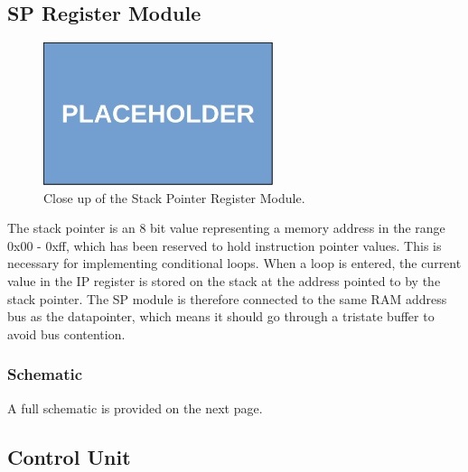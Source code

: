 \subsection{SP Register Module}
\begin{figure}[H]
  \centering
  \includegraphics[width=0.6\textwidth]{img/placeholder}
  \caption{Close up of the Stack Pointer Register Module.}
  \label{fig:spregcloseup}
\end{figure}

The stack pointer is an 8 bit value representing a memory address in the range 0x00 - 0xff, which has been reserved to hold instruction pointer values. This is necessary for implementing conditional loops. When a loop is entered, the current value in the IP register is stored on the stack at the address pointed to by the stack pointer. The SP module is therefore connected to the same RAM address bus as the datapointer, which means it should go through a tristate buffer to avoid bus contention.


\subsubsection{Schematic}
A full schematic is provided on the next page.




\subsection{Control Unit}
